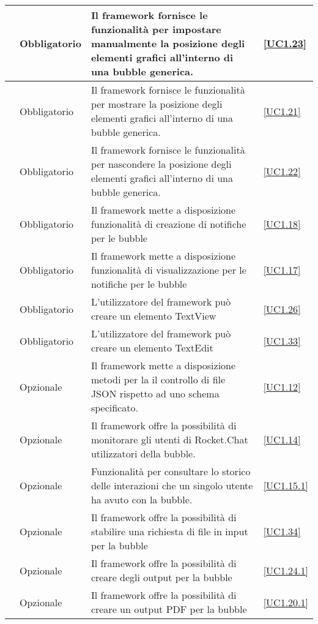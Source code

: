 \begin{longtable}{|P{1.5cm}|P{2.5cm}|P{6.5cm}|P{2.5cm}|}
	\hline \RequisitoObF\label{L13} & Obbligatorio & Il framework fornisce le funzionalità per impostare manualmente la posizione degli elementi grafici all'interno di una bubble generica. & \ref{UC1.23} \\
	\hline \RequisitoObF\label{L14} & Obbligatorio & Il framework fornisce le funzionalità per mostrare la posizione degli elementi grafici all'interno di una bubble generica. & \ref{UC1.21} \\
	\hline \RequisitoObF\label{L63} & Obbligatorio & Il framework fornisce le funzionalità per nascondere la posizione degli elementi grafici all'interno di una bubble generica. &  \ref{UC1.22} \\
	\hline \RequisitoObF\label{L15} & Obbligatorio & Il framework mette a disposizione funzionalità di creazione di notifiche per le bubble & \ref{UC1.18} \\
	\hline \RequisitoObF\label{L16} & Obbligatorio & Il framework mette a disposizione funzionalità di visualizzazione per le notifiche per le bubble & \ref{UC1.17} \\
	\hline \RequisitoObF\label{L33} & Obbligatorio & L'utilizzatore del framework può creare un elemento TextView & \ref{UC1.26} \\
	\hline \RequisitoObF\label{L34} & Obbligatorio & L'utilizzatore del framework può creare un elemento TextEdit & \ref{UC1.33} \\
	\hline \RequisitoOpF\label{L35} & Opzionale & Il framework mette a disposizione metodi per la il controllo di file JSON rispetto ad uno schema specificato. & \ref{UC1.12} \\
	\hline \RequisitoOpF\label{L36} & Opzionale & Il framework offre la possibilità di monitorare gli utenti di Rocket.Chat utilizzatori della bubble. & \ref{UC1.14} \\
	\hline \RequisitoOpF\label{L37} & Opzionale & Funzionalità per consultare lo storico delle interazioni che un singolo utente ha avuto con la bubble. & \ref{UC1.15.1} \\
	\hline \RequisitoOpF\label{L38} & Opzionale & Il framework offre la possibilità di stabilire una richiesta di file in input per la bubble & \ref{UC1.34} \\
	\hline \RequisitoOpF\label{L39} & Opzionale & Il framework offre la possibilità di creare degli output per la bubble & \ref{UC1.24.1} \\
	\hline \RequisitoOpF\label{L40} & Opzionale & Il framework offre la possibilità di creare un output PDF per la bubble & \ref{UC1.20.1} \\	

\end{longtable}
